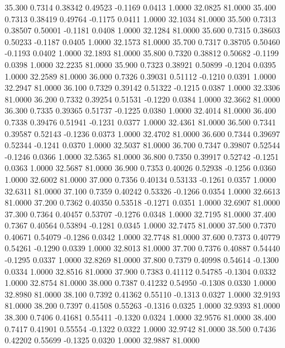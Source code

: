   35.300   0.7314   0.38342   0.49523  -0.1169   0.0413   1.0000  32.0825  81.0000
  35.400   0.7313   0.38419   0.49764  -0.1175   0.0411   1.0000  32.1034  81.0000
  35.500   0.7313   0.38507   0.50001  -0.1181   0.0408   1.0000  32.1284  81.0000
  35.600   0.7315   0.38603   0.50233  -0.1187   0.0405   1.0000  32.1573  81.0000
  35.700   0.7317   0.38705   0.50460  -0.1193   0.0402   1.0000  32.1893  81.0000
  35.800   0.7320   0.38812   0.50682  -0.1199   0.0398   1.0000  32.2235  81.0000
  35.900   0.7323   0.38921   0.50899  -0.1204   0.0395   1.0000  32.2589  81.0000
  36.000   0.7326   0.39031   0.51112  -0.1210   0.0391   1.0000  32.2947  81.0000
  36.100   0.7329   0.39142   0.51322  -0.1215   0.0387   1.0000  32.3306  81.0000
  36.200   0.7332   0.39254   0.51531  -0.1220   0.0384   1.0000  32.3662  81.0000
  36.300   0.7335   0.39365   0.51737  -0.1225   0.0380   1.0000  32.4014  81.0000
  36.400   0.7338   0.39476   0.51941  -0.1231   0.0377   1.0000  32.4361  81.0000
  36.500   0.7341   0.39587   0.52143  -0.1236   0.0373   1.0000  32.4702  81.0000
  36.600   0.7344   0.39697   0.52344  -0.1241   0.0370   1.0000  32.5037  81.0000
  36.700   0.7347   0.39807   0.52544  -0.1246   0.0366   1.0000  32.5365  81.0000
  36.800   0.7350   0.39917   0.52742  -0.1251   0.0363   1.0000  32.5687  81.0000
  36.900   0.7353   0.40026   0.52938  -0.1256   0.0360   1.0000  32.6002  81.0000
  37.000   0.7356   0.40134   0.53133  -0.1261   0.0357   1.0000  32.6311  81.0000
  37.100   0.7359   0.40242   0.53326  -0.1266   0.0354   1.0000  32.6613  81.0000
  37.200   0.7362   0.40350   0.53518  -0.1271   0.0351   1.0000  32.6907  81.0000
  37.300   0.7364   0.40457   0.53707  -0.1276   0.0348   1.0000  32.7195  81.0000
  37.400   0.7367   0.40564   0.53894  -0.1281   0.0345   1.0000  32.7475  81.0000
  37.500   0.7370   0.40671   0.54079  -0.1286   0.0342   1.0000  32.7748  81.0000
  37.600   0.7373   0.40779   0.54261  -0.1290   0.0339   1.0000  32.8013  81.0000
  37.700   0.7376   0.40887   0.54440  -0.1295   0.0337   1.0000  32.8269  81.0000
  37.800   0.7379   0.40998   0.54614  -0.1300   0.0334   1.0000  32.8516  81.0000
  37.900   0.7383   0.41112   0.54785  -0.1304   0.0332   1.0000  32.8754  81.0000
  38.000   0.7387   0.41232   0.54950  -0.1308   0.0330   1.0000  32.8980  81.0000
  38.100   0.7392   0.41362   0.55110  -0.1313   0.0327   1.0000  32.9193  81.0000
  38.200   0.7397   0.41508   0.55263  -0.1316   0.0325   1.0000  32.9393  81.0000
  38.300   0.7406   0.41681   0.55411  -0.1320   0.0324   1.0000  32.9576  81.0000
  38.400   0.7417   0.41901   0.55554  -0.1322   0.0322   1.0000  32.9742  81.0000
  38.500   0.7436   0.42202   0.55699  -0.1325   0.0320   1.0000  32.9887  81.0000
